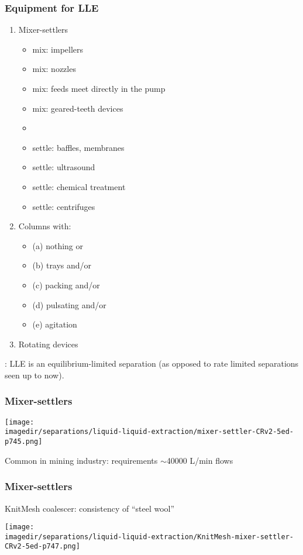 \begin{frame}\frametitle{Equipment for LLE}	
	\begin{enumerate}
		\item	Mixer-settlers
		\begin{itemize}
			\item	mix: impellers
			\item	mix: nozzles
			\item	mix: feeds meet directly in the pump
			\item	mix: geared-teeth devices
			\item	{\color{myOrange}{main aim: good contact; avoid droplets smaller than 2 \micron}}
			\item	settle: baffles, membranes
			\item	settle: ultrasound
			\item	settle: chemical treatment
			\item	settle: centrifuges
		\end{itemize}
		\item	Columns with:
			\begin{itemize}
				\item	(a) nothing or
				\item	(b) trays and/or
				\item	(c) packing and/or
				\item	(d) pulsating and/or
				\item	(e) agitation
			\end{itemize}
		\item	Rotating devices
	\end{enumerate}
	{\color{myRed}{Important point}}: LLE is an equilibrium-limited separation (as opposed to rate limited separations seen up to now).
\end{frame}

\begin{frame}\frametitle{Mixer-settlers}
	\begin{center}
		\texttt{[image: \\imagedir/separations/liquid-liquid-extraction/mixer-settler-CRv2-5ed-p745.png]}
	\end{center}
	Common in mining industry: requirements $\sim$40000 L/min flows
\end{frame}

\begin{frame}\frametitle{Mixer-settlers}
	KnitMesh coalescer: consistency of ``steel wool''
	\begin{center}
		\texttt{[image: \\imagedir/separations/liquid-liquid-extraction/KnitMesh-mixer-settler-CRv2-5ed-p747.png]}
	\end{center}
\end{frame}

